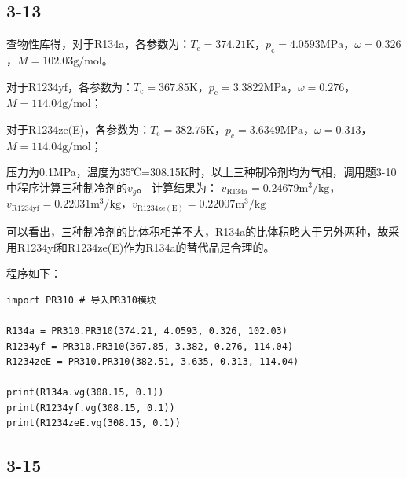 \documentclass[12pt,a4paper]{article}
\begin{document}
\subsection*{3-13}
查物性库得，对于R134a，各参数为：$T_\mathrm{c}=374.21\mathrm{K}$，$p_\mathrm{c}=4.0593\mathrm{MPa}$，$\omega=0.326$，$M=102.03\mathrm{g/mol}$。

对于R1234yf，各参数为：$T_\mathrm{c}=367.85\mathrm{K}$，$p_\mathrm{c}=3.3822\mathrm{MPa}$，$\omega=0.276$，$M=114.04\mathrm{g/mol}$；

对于R1234ze(E)，各参数为：$T_\mathrm{c}=382.75\mathrm{K}$，$p_\mathrm{c}=3.6349\mathrm{MPa}$，$\omega=0.313$，$M=114.04\mathrm{g/mol}$；

压力为0.1MPa，温度为35℃=308.15K时，以上三种制冷剂均为气相，调用题3-10中程序计算三种制冷剂的$v_g$。
计算结果为：
$v_\mathrm{R134a}=0.24679\mathrm{m^3/kg}$，$v_\mathrm{R1234yf}=0.22031\mathrm{m^3/kg}$，$v_\mathrm{R1234ze(E)}=0.22007\mathrm{m^3/kg}$

可以看出，三种制冷剂的比体积相差不大，R134a的比体积略大于另外两种，故采用R1234yf和R1234ze(E)作为R134a的替代品是合理的。

程序如下：
\begin{lstlisting}
import PR310 # 导入PR310模块

R134a = PR310.PR310(374.21, 4.0593, 0.326, 102.03)
R1234yf = PR310.PR310(367.85, 3.382, 0.276, 114.04)
R1234zeE = PR310.PR310(382.51, 3.635, 0.313, 114.04)

print(R134a.vg(308.15, 0.1))
print(R1234yf.vg(308.15, 0.1))
print(R1234zeE.vg(308.15, 0.1))
\end{lstlisting}

\subsection*{3-15}
\end{document}
